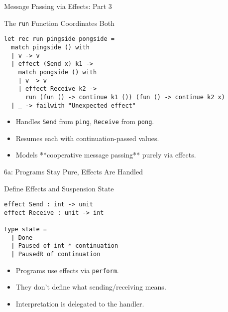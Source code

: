 \begin{frame}[fragile]{Message Passing via Effects: Part 3}
\vspace{-0.5em}
\begin{block}{\scriptsize The \texttt{run} Function Coordinates Both}
\begin{scriptsize}
\begin{verbatim}
let rec run pingside pongside =
  match pingside () with
  | v -> v
  | effect (Send x) k1 ->
    match pongside () with
    | v -> v
    | effect Receive k2 ->
      run (fun () -> continue k1 ()) (fun () -> continue k2 x)
  | _ -> failwith "Unexpected effect"
\end{verbatim}
\end{scriptsize}
\end{block}

\begin{itemize}
  \item Handles \texttt{Send} from \texttt{ping}, \texttt{Receive} from \texttt{pong}.
  \item Resumes each with continuation-passed values.
  \item Models **cooperative message passing** purely via effects.
\end{itemize}
\end{frame}
\begin{frame}[fragile]{6a: Programs Stay Pure, Effects Are Handled}
\vspace{-0.5em}
\begin{block}{\scriptsize Define Effects and Suspension State}
\begin{scriptsize}
\begin{verbatim}
effect Send : int -> unit
effect Receive : unit -> int

type state =
  | Done
  | Paused of int * continuation
  | PausedR of continuation
\end{verbatim}
\end{scriptsize}
\end{block}

\begin{itemize}
  \item Programs use effects via \texttt{perform}.
  \item They don’t define what sending/receiving means.
  \item Interpretation is delegated to the handler.
\end{itemize}
\end{frame}
